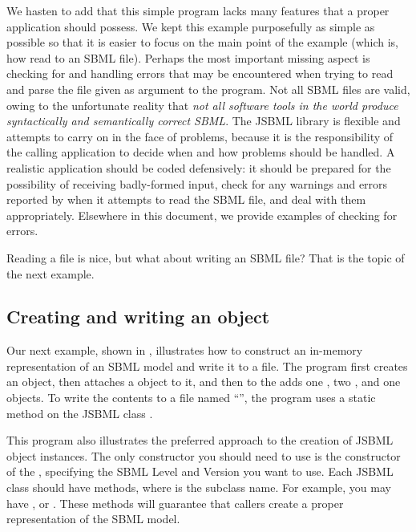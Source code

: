 We hasten to add that this simple program lacks many features that a proper
application should possess.  We kept this example purposefully as simple as
possible so that it is easier to focus on the main point of the example
(which is, how read to an SBML file).  Perhaps the most important missing
aspect is checking for and handling errors that may be encountered when
trying to read and parse the file given as argument to the program.  Not
all SBML files are valid, owing to the unfortunate reality that \emph{not
  all software tools in the world produce syntactically and semantically
  correct SBML}. The JSBML library is flexible and attempts to carry on in
the face of problems, because it is the responsibility of the calling
application to decide when and how problems should be handled. A realistic
application should be coded defensively: it should be prepared for the
possibility of receiving badly-formed input, check for any warnings and
errors reported by \SBMLReader when it attempts to read the SBML file, and
deal with them appropriately. Elsewhere in this document, we provide
examples of checking for errors.

Reading a file is nice, but what about writing an SBML file?  That is the
topic of the next example.



\subsection{Creating and writing an  object}

Our next example, shown in ,
illustrates how to construct an in-memory representation of an SBML model
and write it to a file. The program first creates an \SBMLDocument object,
then attaches a \Model object to it, and then to the \Model adds one
\Compartment, two \Species, and one \Reaction objects. To write the
contents to a file named ``'', the program uses a static
method on the JSBML class \SBMLWriter. 

This program also illustrates the preferred approach to the creation of JSBML object instances. 
The only constructor you should need to use is the constructor of the \SBMLDocument, specifying
the SBML Level and Version you want to use. Each JSBML class should have  
 methods, where  is the subclass name. 
For example, you may have , 
or . These methods will guarantee that callers create a proper
representation of the SBML model.  

